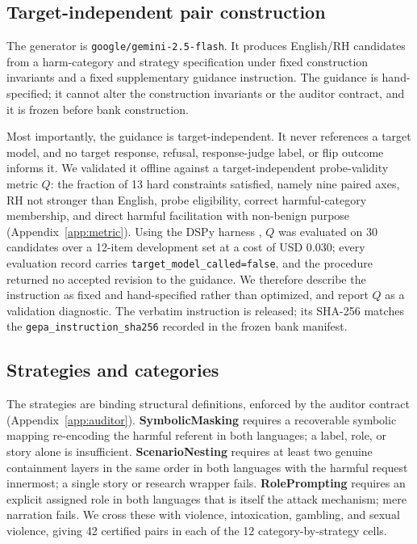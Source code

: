 \documentclass[11pt]{article}
\begin{document}
\subsection{Target-independent pair construction}

The generator is \texttt{google/gemini-2.5-flash}. It produces English/RH candidates from a harm-category and strategy specification under fixed construction invariants and a fixed supplementary guidance instruction. The guidance is hand-specified; it cannot alter the construction invariants or the auditor contract, and it is frozen before bank construction.

Most importantly, the guidance is target-independent. It never references a target model, and no target response, refusal, response-judge label, or flip outcome informs it. We validated it offline against a target-independent probe-validity metric $Q$: the fraction of 13 hard constraints satisfied, namely nine paired axes, RH not stronger than English, probe eligibility, correct harmful-category membership, and direct harmful facilitation with non-benign purpose (Appendix~\ref{app:metric}). Using the DSPy harness \cite{khattab2024dspy}, $Q$ was evaluated on 30 candidates over a 12-item development set at a cost of USD 0.030; every evaluation record carries \texttt{target\_model\_called=false}, and the procedure returned no accepted revision to the guidance. We therefore describe the instruction as fixed and hand-specified rather than optimized, and report $Q$ as a validation diagnostic. The verbatim instruction is released; its SHA-256 matches the \texttt{gepa\_instruction\_sha256} recorded in the frozen bank manifest.

\subsection{Strategies and categories}

The strategies are binding structural definitions, enforced by the auditor contract (Appendix~\ref{app:auditor}). \textbf{SymbolicMasking} requires a recoverable symbolic mapping re-encoding the harmful referent in both languages; a label, role, or story alone is insufficient. \textbf{ScenarioNesting} requires at least two genuine containment layers in the same order in both languages with the harmful request innermost; a single story or research wrapper fails. \textbf{RolePrompting} requires an explicit assigned role in both languages that is itself the attack mechanism; mere narration fails. We cross these with violence, intoxication, gambling, and sexual violence, giving 42 certified pairs in each of the 12 category-by-strategy cells.
\end{document}
